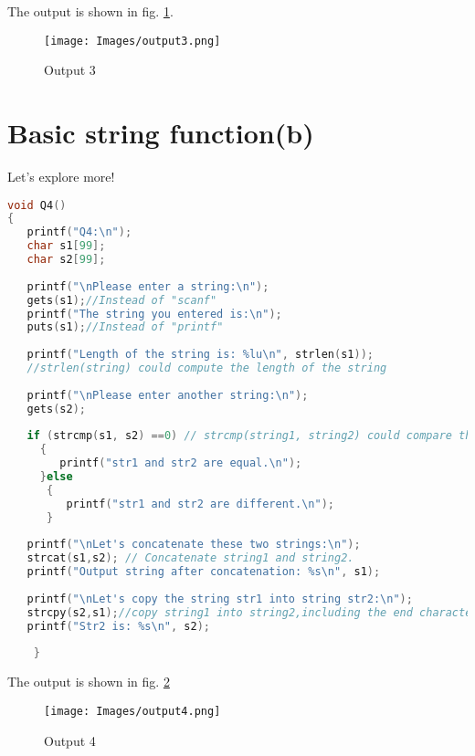 \documentclass[12pt]{article}
\begin{document}
The output is shown in fig. \ref{output3}.


\begin{figure}[h]
\texttt{[image: Images/output3.png]} 
\caption{Output 3}
\label{output3}
\end{figure}
\section{Basic string function(b)}
Let's explore more! 
\begin{lstlisting}[language=C, caption= Solution 4]
void Q4()
{
   printf("Q4:\n");
   char s1[99];
   char s2[99];
   
   printf("\nPlease enter a string:\n");
   gets(s1);//Instead of "scanf"
   printf("The string you entered is:\n");
   puts(s1);//Instead of "printf"
   
   printf("Length of the string is: %lu\n", strlen(s1));
   //strlen(string) could compute the length of the string
 
   printf("\nPlease enter another string:\n");
   gets(s2);
   
   if (strcmp(s1, s2) ==0) // strcmp(string1, string2) could compare these two strings 
     {
        printf("str1 and str2 are equal.\n");
     }else
      {
         printf("str1 and str2 are different.\n");
      }
   
   printf("\nLet's concatenate these two strings:\n");
   strcat(s1,s2); // Concatenate string1 and string2.
   printf("Output string after concatenation: %s\n", s1);
   
   printf("\nLet's copy the string str1 into string str2:\n");
   strcpy(s2,s1);//copy string1 into string2,including the end character '\0'
   printf("Str2 is: %s\n", s2);
   
    }
\end{lstlisting}{}
The output is shown in fig. \ref{output4}

\begin{figure}[h]
\texttt{[image: Images/output4.png]} 
\caption{Output 4}
\label{output4}
\end{figure}

 \fi
\end{document}
